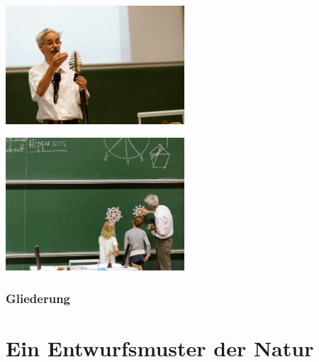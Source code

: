 \documentclass[12pt,compress,english,utf8,t]{beamer}
\begin{document}
\begin{frame}[plain,c]
  \includegraphics[width=0.5\textwidth]{Eschenburg-Zapfen-64745753348.jpg}
  \bigskip

  \hfill\includegraphics[width=0.5\textwidth]{Eschenburg-Tafel.jpg}
\end{frame}

\begin{frame}\frametitle{Gliederung}\tableofcontents\end{frame}


\section{Ein Entwurfsmuster der Natur}
\end{document}

